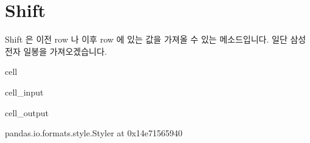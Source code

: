 \documentclass[letterpaper,10pt,english]{jupyterBook}
\begin{document}
\section{Shift}
\label{\detokenize{chapter2/2.2.6_Useful_Techniques:shift}}\label{\detokenize{chapter2/2.2.6_Useful_Techniques::doc}}
\sphinxAtStartPar
Shift 은 이전 row 나 이후 row 에 있는 값을 가져올 수 있는 메소드입니다. 일단 삼성전자 일봉을 가져오겠습니다.

\begin{sphinxuseclass}{cell}\begin{sphinxVerbatimInput}

\begin{sphinxuseclass}{cell_input}
\begin{sphinxVerbatim}[commandchars=\\\{\}]
    

   
     

\end{sphinxVerbatim}

\end{sphinxuseclass}\end{sphinxVerbatimInput}
\begin{sphinxVerbatimOutput}

\begin{sphinxuseclass}{cell_output}
\begin{sphinxVerbatim}[commandchars=\\\{\}]
\PYGZlt{}pandas.io.formats.style.Styler at 0x14e71565940\PYGZgt{}
\end{sphinxVerbatim}

\end{sphinxuseclass}\end{sphinxVerbatimOutput}

\end{sphinxuseclass}
\end{document}
